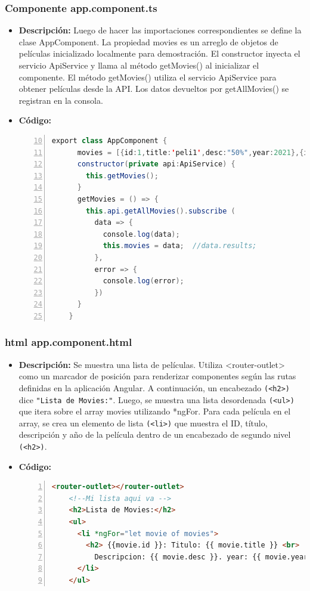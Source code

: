 \documentclass{article}
\begin{document}
  \subsubsection{Componente app.component.ts}
  \begin{itemize}
    \item \textbf{Descripción: }Luego de hacer las importaciones correspondientes se define la clase AppComponent. 
    La propiedad movies es un arreglo de objetos de películas inicializado localmente para demostración. 
    El constructor inyecta el servicio ApiService y llama al método getMovies() al inicializar el componente. 
    El método getMovies() utiliza el servicio ApiService para obtener películas desde la API. Los datos devueltos 
    por getAllMovies() se registran en la consola.
    \item \textbf{Código: }
    \begin{lstlisting}[language=java, numbers=left, firstnumber=10, numberstyle=\color{black}]
    export class AppComponent {
      movies = [{id:1,title:'peli1',desc:"50%",year:2021},{id:2,title:'peli2', desc:'50%',year:2022}];
      constructor(private api:ApiService) {
        this.getMovies();
      }
      getMovies = () => {
        this.api.getAllMovies().subscribe (
          data => {
            console.log(data);
            this.movies = data;  //data.results;
          },
          error => {
            console.log(error);
          }) 
      } 
    }
    \end{lstlisting}
  \end{itemize}
  \subsubsection{html app.component.html}
  \begin{itemize}
    \item \textbf{Descripción: }Se muestra una lista de películas. Utiliza <router-outlet> como un marcador de posición para renderizar 
    componentes según las rutas definidas en la aplicación Angular. A continuación, un encabezado \verb|(<h2>)| dice 
    \verb|"Lista de Movies:"|. Luego, se muestra una lista desordenada \verb|(<ul>)| que itera sobre el array movies utilizando 
    *ngFor. Para cada película en el array, se crea un elemento de lista \verb|(<li>)| que muestra el ID, título, descripción 
    y año de la película dentro de un encabezado de segundo nivel \verb|(<h2>)|.
    \item \textbf{Código: }
    \begin{lstlisting}[language=html, numbers=left, firstnumber=1, numberstyle=\color{orange}]
    <router-outlet></router-outlet>
    <!--Mi lista aqui va -->
    <h2>Lista de Movies:</h2>
    <ul>
      <li *ngFor="let movie of movies">
        <h2> {{movie.id }}: Titulo: {{ movie.title }} <br>
          Descripcion: {{ movie.desc }}. year: {{ movie.year }}</h2>
      </li>
    </ul>
    \end{lstlisting}
  \end{itemize}
\end{document}

